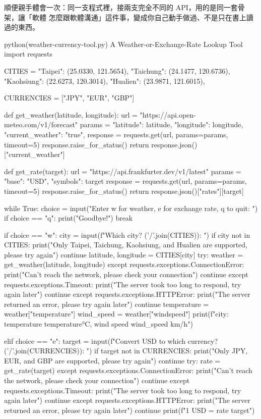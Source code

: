 順便親手體會一次：同一支程式裡，接兩支完全不同的 API，用的是同一套骨架，讓「軟體
怎麼跟軟體溝通」這件事，變成你自己動手做過、不是只在書上讀過的東西。

\begin{example}{python}{(weather-currency-tool.py) A Weather-or-Exchange-Rate Lookup Tool}
import requests

CITIES = {
    "Taipei": (25.0330, 121.5654),
    "Taichung": (24.1477, 120.6736),
    "Kaohsiung": (22.6273, 120.3014),
    "Hualien": (23.9871, 121.6015),
}

CURRENCIES = ["JPY", "EUR", "GBP"]


def get_weather(latitude, longitude):
    url = "https://api.open-meteo.com/v1/forecast"
    params = {
        "latitude": latitude,
        "longitude": longitude,
        "current_weather": "true",
    }
    response = requests.get(url, params=params, timeout=5)
    response.raise_for_status()
    return response.json()["current_weather"]


def get_rate(target):
    url = "https://api.frankfurter.dev/v1/latest"
    params = {"base": "USD", "symbols": target}
    response = requests.get(url, params=params, timeout=5)
    response.raise_for_status()
    return response.json()["rates"][target]


while True:
    choice = input("Enter w for weather, e for exchange rate, q to quit: ")
    if choice == "q":
        print("Goodbye!")
        break

    if choice == "w":
        city = input(f"Which city? ({'/'.join(CITIES)}): ")
        if city not in CITIES:
            print("Only Taipei, Taichung, Kaohsiung, and Hualien are supported, please try again")
            continue
        latitude, longitude = CITIES[city]
        try:
            weather = get_weather(latitude, longitude)
        except requests.exceptions.ConnectionError:
            print("Can't reach the network, please check your connection")
            continue
        except requests.exceptions.Timeout:
            print("The server took too long to respond, try again later")
            continue
        except requests.exceptions.HTTPError:
            print("The server returned an error, please try again later")
            continue
        temperature = weather["temperature"]
        wind_speed = weather["windspeed"]
        print(f"{city}: temperature {temperature}°C, wind speed {wind_speed} km/h")

    elif choice == "e":
        target = input(f"Convert USD to which currency? ({'/'.join(CURRENCIES)}): ")
        if target not in CURRENCIES:
            print("Only JPY, EUR, and GBP are supported, please try again")
            continue
        try:
            rate = get_rate(target)
        except requests.exceptions.ConnectionError:
            print("Can't reach the network, please check your connection")
            continue
        except requests.exceptions.Timeout:
            print("The server took too long to respond, try again later")
            continue
        except requests.exceptions.HTTPError:
            print("The server returned an error, please try again later")
            continue
        print(f"1 USD = {rate} {target}")


\end{example}
